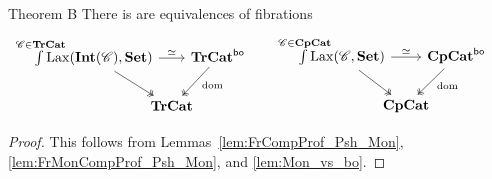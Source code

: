 \documentclass[11pt,oneside,article]{memoir}
\begin{document}
\begin{named}{Theorem B}\label{thm:TheoremB}
   There is are equivalences of fibrations
   \begin{equation*}
      \begin{tikzcd}[column sep=-1em]
         \int\limits^{\mathclap{\cat{C}\in\TrCat}} \Lax(\Int(\cat{C}),\Set)
               \ar[rr,"\equiv"] \ar[dr,two heads]
            && \TrCat^{\bo} \ar[dl,two heads,"\dom" pos=.4] \\
         & \TrCat &
      \end{tikzcd}
      \qquad\quad
      \begin{tikzcd}[column sep=-1em]
         \int\limits^{\mathclap{\cat{C}\in\CompCat}} \Lax(\cat{C},\Set)
               \ar[rr,"\equiv"] \ar[dr,two heads]
            && \CompCat^{\bo} \ar[dl,two heads,"\dom" pos=.4] \\
         & \CompCat &
      \end{tikzcd}
   \end{equation*}
\end{named}

\begin{proof}
   This follows from Lemmas~\ref{lem:FrCompProf_Psh_Mon}, \ref{lem:FrMonCompProf_Psh_Mon}, and \ref{lem:Mon_vs_bo}.
\end{proof}
\end{document}
